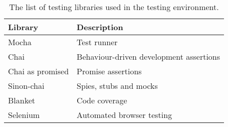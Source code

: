 \begin{table}[H]
\caption[Testing environment]{The list of testing libraries used in the testing environment.}
\label{tab:testing_environment}
\begin{tabularx}{\textwidth}{@{}XX@{}}
	\toprule
	\textbf{Library} & \textbf{Description} \\
	\midrule
	Mocha & Test runner \\
	Chai & Behaviour-driven development assertions \\
	Chai as promised & Promise assertions \\
	Sinon-chai & Spies, stubs and mocks \\
	Blanket & Code coverage \\
	Selenium & Automated browser testing \\
	\bottomrule
\end{tabularx}
\end{table}